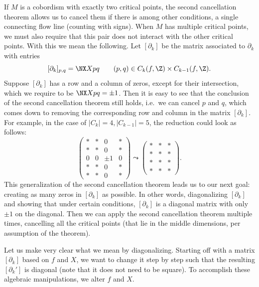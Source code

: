 If $M$ is a cobordism with exactly two critical points,
the second cancellation theorem allows us to cancel them if there is among other conditions, a single connecting flow line (counting with signs).
When $M$ has multiple critical points, we must also require that this pair does not interact with the other critical points.
With this we mean the following.
Let $[\partial_k]$ be the matrix associated to $\partial_k$ with entries \[
    [\partial_k]_{p, q} = \NX X p q \qquad (p,q) \in C_k(f, \Z) \times  C_{k-1}(f, \Z).
\]
Suppose $[\partial_k]$ has a row and a column of zeros, except for their intersection, which we require to be $\NX X p q = \pm 1 $.
Then it is easy to see that the conclusion of the second cancellation theorem still holds,  i.e.\ we can cancel $p$ and  $q$, which comes down to removing the corresponding row and column in the matrix $[\partial_k]$.
For example, in the case of $|C_k| = 4, |C_{k-1}| = 5$, the reduction could look as follows:
\[
    \begin{pmatrix}
        * & *&0 & *\\
        * & *&0 & *\\
        0 & 0&\pm 1 & 0 \\
        * & *&0 & *\\
        * & *&0 & *
    \end{pmatrix}
\leadsto
\begin{pmatrix}
    * & *& *\\
    * & *& *\\
    * & *& *\\
    * & *& *
\end{pmatrix}
.\] 
This generalization of the second cancellation theorem leads us to our next goal: creating as many zeros in $[\partial_k]$ as possible.
In other words, diagonalizing $[\partial_k]$ and showing that under certain conditions,  $[\partial_k]$ is a diagonal matrix with only $\pm 1$ on the diagonal. Then we can apply the second cancellation theorem multiple times, cancelling all the critical points (that lie in the middle dimensions, per assumption of the theorem).

Let us make very clear what we mean by diagonalizing.
Starting off with a matrix $[\partial_k]$ based on $f$ and $X$, we want to change it step by step such that the resulting $[\partial_k']$ is diagonal (note that it does not need to be square).
To accomplish these algebraic manipulations, we alter $f$ and  $X$.

